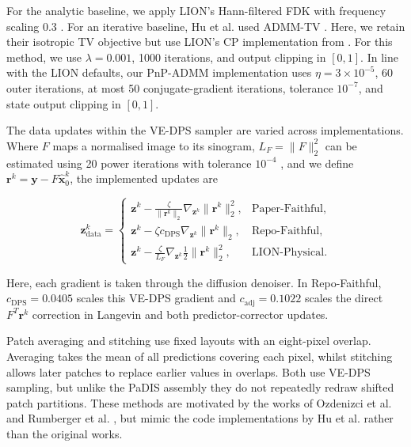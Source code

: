 For the analytic baseline, we apply LION's Hann-filtered FDK with frequency scaling 0.3 \cite{feldkamp_practical_1984}. For an iterative baseline, Hu et al. used ADMM-TV \cite{hu_learning_2024}. Here, we retain their isotropic TV objective \cite{rudin_nonlinear_1992} but use LION's CP implementation from  \cite{chambolle_first-order_2011}. For this method, we use $\lambda=0.001$, 1000 iterations, and output clipping in $[0,1]$. In line with the LION defaults, our PnP-ADMM implementation uses $\eta=3\times10^{-5}$, 60 outer iterations, at most 50 conjugate-gradient iterations, tolerance $10^{-7}$, and state output clipping in $[0,1]$.

The data updates within the VE-DPS sampler are varied across implementations. Where $F$ maps a normalised image to its sinogram, $L_F=\lVert F\rVert_2^2$ can be estimated using 20 power iterations with tolerance $10^{-4}$ \cite{golub_matrix_2012,beck_fast_2009}, and we define $\mathbf{r}^k=\mathbf{y}-F\hat{\mathbf{x}}_0^k$, the implemented updates are

\begin{equation}
\mathbf{z}_{\mathrm{data}}^k=
\begin{cases}
\displaystyle \mathbf{z}^k-\frac{\zeta}{\lVert\mathbf{r}^k\rVert_2}
\nabla_{\mathbf{z}^k}\lVert\mathbf{r}^k\rVert_2^2,
& \text{Paper-Faithful},\\[6pt]
\displaystyle \mathbf{z}^k-\zeta c_{\mathrm{DPS}}
\nabla_{\mathbf{z}^k}\lVert\mathbf{r}^k\rVert_2,
& \text{Repo-Faithful},\\[6pt]
\displaystyle \mathbf{z}^k-\frac{\zeta}{L_F}
\nabla_{\mathbf{z}^k}\frac{1}{2}\lVert\mathbf{r}^k\rVert_2^2,
& \text{LION-Physical}.
\end{cases}
\label{eq:implementation_data_updates}
\end{equation}

Here, each gradient is taken through the diffusion denoiser. In Repo-Faithful, $c_{\mathrm{DPS}}=0.0405$ scales this VE-DPS gradient and $c_{\mathrm{adj}}=0.1022$ scales the direct $F^T\mathbf{r}^k$ correction in Langevin and both predictor-corrector updates.

Patch averaging and stitching use fixed layouts with an eight-pixel overlap.
Averaging takes the mean of all predictions covering each pixel, whilst
stitching allows later patches to replace earlier values in overlaps. Both use
VE-DPS sampling, but unlike the PaDIS assembly they do not repeatedly redraw shifted patch
partitions. These methods are motivated by the works of Ozdenizci et al.
\cite{ozdenizci_restoring_2023} and Rumberger et al. \cite{rumberger_how_2021},
but mimic the code implementations by Hu et al. \cite{hu_jasonhu4padis_2026-1}
rather than the original works.

